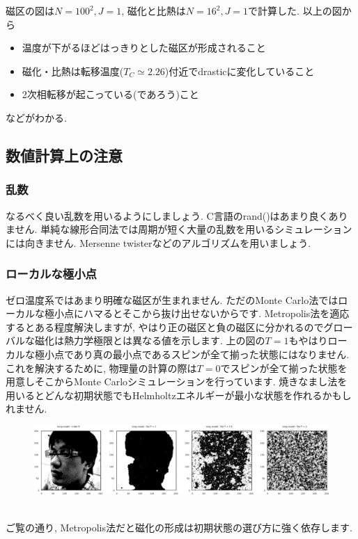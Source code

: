 \documentclass[10.5pt,a4paper]{jreport}
\begin{document}
磁区の図は$N=100^2, J=1$, 磁化と比熱は$N=16^2, J=1$で計算した. 以上の図から
\begin{itemize}
\item 温度が下がるほどはっきりとした磁区が形成されること
\item 磁化・比熱は転移温度($T_C \simeq 2.26$)付近でdrasticに変化していること
\item 2次相転移が起こっている(であろう)こと
\end{itemize}
などがわかる.

\subsection{数値計算上の注意}
\subsubsection{乱数}
なるべく良い乱数を用いるようにしましょう. C言語のrand()はあまり良くありません. 単純な線形合同法では周期が短く大量の乱数を用いるシミュレーションには向きません. Mersenne twisterなどのアルゴリズムを用いましょう.
\subsubsection{ローカルな極小点}
ゼロ温度系ではあまり明確な磁区が生まれません. ただのMonte Carlo法ではローカルな極小点にハマるとそこから抜け出せないからです. Metropolis法を適応するとある程度解決しますが, やはり正の磁区と負の磁区に分かれるのでグローバルな磁化は熱力学極限とは異なる値を示します. 上の図の$T=1$もやはりローカルな極小点であり真の最小点であるスピンが全て揃った状態にはなりません. これを解決するために, 物理量の計算の際は$T=0$でスピンが全て揃った状態を用意しそこからMonte Carloシミュレーションを行っています. 焼きなまし法を用いるとどんな初期状態でもHelmholtzエネルギーが最小な状態を作れるかもしれません.
\begin{figure}[htbp]
  \begin{center}
    \includegraphics[width = 17cm]{./EPS/Dai.eps}
  \end{center}
  \label{Dai}
\end{figure}\\
ご覧の通り, Metropolis法だと磁化の形成は初期状態の選び方に強く依存します.
\end{document}
